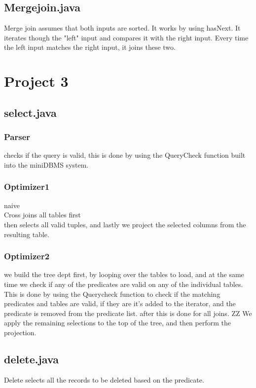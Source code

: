 \documentclass[a4paper,10pt,titlepage]{report}
\begin{document}
 
\subsection{Mergejoin.java}
 
Merge join assumes that both inputs are sorted.
It works by using hasNext. It iterates though the "left" input and compares it with the right input. Every time the left input matches the right input, it joins these two.

\newpage
\section{Project 3}
\subsection{select.java}
\subsubsection{Parser}
checks if the query is valid, this is done by using the QueryCheck function built into the miniDBMS system.
\subsubsection{Optimizer1}
naive\\
Cross joins all tables first \\ then selects all valid tuples, and lastly we project the selected columns from the resulting table.

\subsubsection{Optimizer2}

we build the tree dept first, by looping over the tables to load, and at the same time we check if any of the predicates are valid on any of the individual tables.
This is done by using the Querycheck function to check if the matching predicates and tables are valid, if they are it's added to the iterator, and the predicate is removed from the predicate list. after this is done for all joins.
ZZ
We apply the remaining selections to the top of the tree, and then perform the projection.


\subsection{delete.java}

Delete selects all the records to be deleted based on the predicate. 
\end{document}
